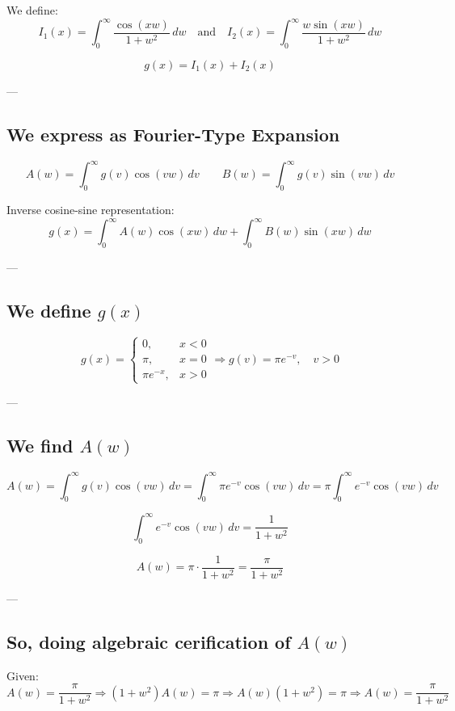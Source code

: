 \documentclass{article}
\begin{document}
We define:
\[
I_1(x) = \int_0^\infty \frac{\cos(xw)}{1 + w^2} \, dw
\quad\text{and}\quad
I_2(x) = \int_0^\infty \frac{w \sin(xw)}{1 + w^2} \, dw
\]

\[
g(x) = I_1(x) + I_2(x)
\]

---

\subsection*{We express as Fourier-Type Expansion}

\[
A(w) = \int_0^\infty g(v) \cos(vw) \, dv
\qquad
B(w) = \int_0^\infty g(v) \sin(vw) \, dv
\]

Inverse cosine-sine representation:
\[
g(x) = \int_0^\infty A(w) \cos(xw) \, dw + \int_0^\infty B(w) \sin(xw) \, dw
\]

---

\subsection*{We define \( g(x) \)}

\[
g(x) =
\begin{cases}
0, & x < 0 \\
\pi, & x = 0 \\
\pi e^{-x}, & x > 0
\end{cases}
\Rightarrow g(v) = \pi e^{-v}, \quad v > 0
\]

---

\subsection*{We find \( A(w) \)}

\[
A(w) = \int_0^\infty g(v) \cos(vw) \, dv
= \int_0^\infty \pi e^{-v} \cos(vw) \, dv
= \pi \int_0^\infty e^{-v} \cos(vw) \, dv
\]

\[
\int_0^\infty e^{-v} \cos(vw) \, dv = \frac{1}{1 + w^2}
\]

\[
A(w) = \pi \cdot \frac{1}{1 + w^2}
= \frac{\pi}{1 + w^2}
\]

---

\subsection*{So, doing algebraic cerification of \( A(w) \)}

Given:
\[
A(w) = \frac{\pi}{1 + w^2}
\Rightarrow (1 + w^2)A(w) = \pi
\Rightarrow A(w)(1 + w^2) = \pi
\Rightarrow A(w) = \frac{\pi}{1 + w^2}
\]
\end{document}
